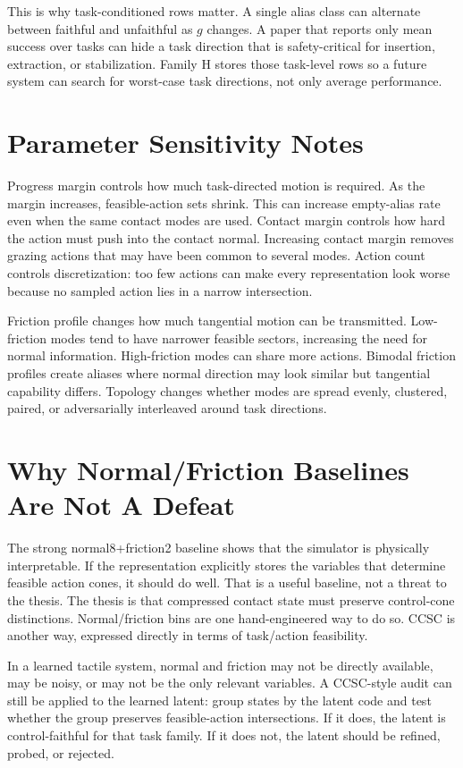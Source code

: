 \documentclass{article}
\begin{document}
This is why task-conditioned rows matter. A single alias class can alternate between faithful and unfaithful as $g$ changes. A paper that reports only mean success over tasks can hide a task direction that is safety-critical for insertion, extraction, or stabilization. Family H stores those task-level rows so a future system can search for worst-case task directions, not only average performance.

\section{Parameter Sensitivity Notes}
Progress margin controls how much task-directed motion is required. As the margin increases, feasible-action sets shrink. This can increase empty-alias rate even when the same contact modes are used. Contact margin controls how hard the action must push into the contact normal. Increasing contact margin removes grazing actions that may have been common to several modes. Action count controls discretization: too few actions can make every representation look worse because no sampled action lies in a narrow intersection.

Friction profile changes how much tangential motion can be transmitted. Low-friction modes tend to have narrower feasible sectors, increasing the need for normal information. High-friction modes can share more actions. Bimodal friction profiles create aliases where normal direction may look similar but tangential capability differs. Topology changes whether modes are spread evenly, clustered, paired, or adversarially interleaved around task directions.

\section{Why Normal/Friction Baselines Are Not A Defeat}
The strong normal8+friction2 baseline shows that the simulator is physically interpretable. If the representation explicitly stores the variables that determine feasible action cones, it should do well. That is a useful baseline, not a threat to the thesis. The thesis is that compressed contact state must preserve control-cone distinctions. Normal/friction bins are one hand-engineered way to do so. CCSC is another way, expressed directly in terms of task/action feasibility.

In a learned tactile system, normal and friction may not be directly available, may be noisy, or may not be the only relevant variables. A CCSC-style audit can still be applied to the learned latent: group states by the latent code and test whether the group preserves feasible-action intersections. If it does, the latent is control-faithful for that task family. If it does not, the latent should be refined, probed, or rejected.
\end{document}
